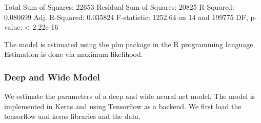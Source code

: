 \documentclass[]{article}
\newenvironment{Shaded}{\begin{snugshade}}{\end{snugshade}}
\newcommand{\DataTypeTok}[1]{\textcolor[rgb]{0.13,0.29,0.53}{#1}}
\newcommand{\DecValTok}[1]{\textcolor[rgb]{0.00,0.00,0.81}{#1}}
\newcommand{\KeywordTok}[1]{\textcolor[rgb]{0.13,0.29,0.53}{\textbf{#1}}}
\newcommand{\NormalTok}[1]{#1}
\newcommand{\OtherTok}[1]{\textcolor[rgb]{0.56,0.35,0.01}{#1}}
\newcommand{\StringTok}[1]{\textcolor[rgb]{0.31,0.60,0.02}{#1}}
\begin{document}
Total Sum of Squares: 22653 Residual Sum of Squares: 20825 R-Squared:
0.080699 Adj. R-Squared: 0.035824 F-statistic: 1252.64 on 14 and 199775
DF, p-value: \textless{} 2.22e-16

\begin{Shaded}
\end{Shaded}

The model is estimated using the plm package in the R programming
language. Estimation is done via maximum likelihood.

\hypertarget{deep-and-wide-model}{%
\subsubsection{Deep and Wide Model}\label{deep-and-wide-model}}

We estimate the parameters of a deep and wide neural net model. The
model is implemented in Keras and using Tensorflow as a backend. We
first load the tensorflow and keras libraries and the data.
\end{document}
